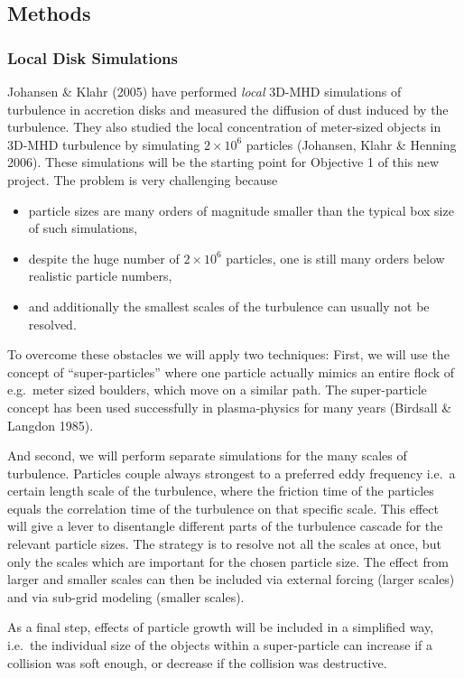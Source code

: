 \subsection{Methods}
\subsubsection{Local Disk Simulations}
Johansen \& Klahr (2005) have performed {\em local} 3D-MHD simulations of
turbulence in accretion disks and measured the diffusion of dust induced by
the turbulence. They also studied the local concentration of meter-sized
objects in 3D-MHD turbulence by simulating $2\times 10^6$ particles
(Johansen, Klahr \& Henning 2006).  These simulations will be the starting
point for Objective 1 of this new project. The problem is very challenging
because
\begin{itemize} 
\item{particle sizes are many orders of magnitude smaller than the typical box size of such
simulations,}
\item{despite the huge number of $2\times 10^6$ particles, one is still many orders below realistic particle numbers,}
\item{and additionally the smallest scales of the turbulence can usually
not be resolved.} 
\end{itemize}
%
To overcome these obstacles we will apply two techniques: First, we will use
the concept of ``super-particles'' where one particle actually mimics an
entire flock of e.g.\ meter sized boulders, which move on a similar
path. The super-particle concept has been used successfully in plasma-physics
for many years (Birdsall \& Langdon 1985).

And second, we will perform separate simulations for the many scales of
turbulence.  Particles couple always strongest to a preferred eddy
frequency i.e.\ a certain length scale of the turbulence, where the friction
time of the particles equals the correlation time of the turbulence on that
specific scale.  This effect will give a lever to disentangle different
parts of the turbulence cascade for the relevant particle sizes.  The
strategy is to resolve not all the scales at once, but only the scales which
are important for the chosen particle size.  The effect from larger and
smaller scales can then be included via external forcing (larger scales) and
via sub-grid modeling (smaller scales).

As a final step, effects of particle growth will be included in a simplified
way, i.e.\ the individual size of the objects within a super-particle can
increase if a collision was soft enough, or decrease if the collision was
destructive.

